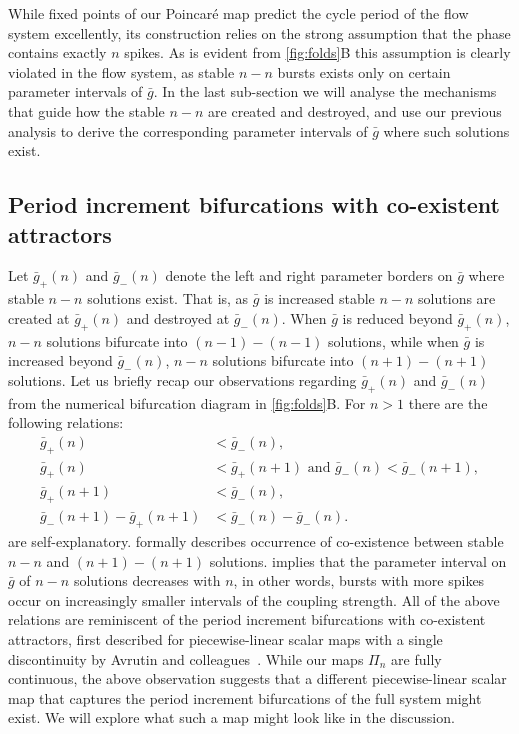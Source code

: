 While fixed points of our Poincaré map predict the cycle period of the flow system excellently, its construction relies on the strong assumption that the \free{} phase contains exactly $n$ spikes.
As is evident from \cref{fig:folds}B this assumption is clearly violated in the flow system, as stable $n-n$ bursts exists only on certain parameter intervals of $\bar g$.
In the last sub-section we will analyse the mechanisms that guide how the stable $n-n$ are created and destroyed, and use our previous analysis to derive the corresponding parameter intervals of $\bar g$ where such solutions exist.

\subsection{Period increment bifurcations with co-existent attractors}
Let $\bar g_+(n)$ and $\bar g_-(n)$ denote the left and right parameter borders on $\bar g$ where stable $n-n$ solutions exist.
That is, as $\bar g$ is increased stable $n-n$ solutions are created at $\bar g_+(n)$ and destroyed at $\bar g_-(n)$.
When $\bar g$ is reduced beyond $\bar g_+(n)$, $n-n$ solutions bifurcate into $(n-1)-(n-1)$ solutions, while when $\bar g$ is increased beyond $\bar g_-(n)$, $n-n$ solutions bifurcate into $(n+1)-(n+1)$ solutions.
Let us briefly recap our observations regarding $\bar g_+(n)$ and $\bar g_-(n)$ from the numerical bifurcation diagram in \cref{fig:folds}B.
For $n>1$ there are the following relations:
\begin{align}
	\bar g_+(n)                   & < \bar g_-(n)\label{eq:easy1},                                         \\
	\bar g_+(n)                   & < \bar g_+(n+1)\text{ and } \bar g_-(n)<\bar g_-(n+1)\label{eq:easy2}, \\
	\bar g_+(n+1)                 & < \bar g_-(n)\label{eq:coexistence},                                   \\
	\bar g_-(n+1) - \bar g_+(n+1) & < \bar g_-(n) - \bar g_-(n)\label{eq:robustness}.
\end{align}
 are self-explanatory.
 formally describes occurrence of co-existence between stable $n-n$ and $(n+1)-(n+1)$ solutions.
 implies that the parameter interval on $\bar g$ of $n-n$ solutions decreases with $n$, in other words, bursts with more spikes occur on increasingly smaller intervals of the coupling strength.
All of the above relations are reminiscent of the period increment bifurcations with co-existent attractors, first described for piecewise-linear scalar maps with a single discontinuity by Avrutin and colleagues~\cite[e.g.
	see][]{gardini2012,tramontana2012,avrutin2011,gardini2012}.
While our maps $\Pi_n$ are fully continuous, the above observation suggests that a different piecewise-linear scalar map that captures the period increment bifurcations of the full system might exist.
We will explore what such a map might look like in the discussion.

